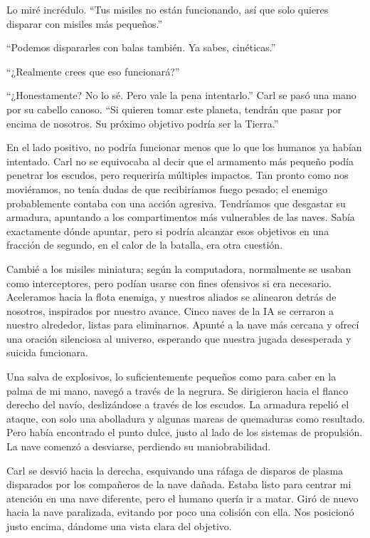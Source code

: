 Lo miré incrédulo. “Tus misiles no están funcionando, así que solo quieres disparar con misiles más pequeños.”

“Podemos dispararles con balas también. Ya sabes, cinéticas.”

“¿Realmente crees que eso funcionará?”

“¿Honestamente? No lo sé. Pero vale la pena intentarlo.” Carl se pasó una mano por su cabello canoso. “Si quieren tomar este planeta, tendrán que pasar por encima de nosotros. Su próximo objetivo podría ser la Tierra.”

En el lado positivo, no podría funcionar menos que lo que los humanos ya habían intentado. Carl no se equivocaba al decir que el armamento más pequeño podía penetrar los escudos, pero requeriría múltiples impactos. Tan pronto como nos moviéramos, no tenía dudas de que recibiríamos fuego pesado; el enemigo probablemente contaba con una acción agresiva. Tendríamos que desgastar su armadura, apuntando a los compartimentos más vulnerables de las naves. Sabía exactamente dónde apuntar, pero si podría alcanzar esos objetivos en una fracción de segundo, en el calor de la batalla, era otra cuestión.

Cambié a los misiles miniatura; según la computadora, normalmente se usaban como interceptores, pero podían usarse con fines ofensivos si era necesario. Aceleramos hacia la flota enemiga, y nuestros aliados se alinearon detrás de nosotros, inspirados por nuestro avance. Cinco naves de la IA se cerraron a nuestro alrededor, listas para eliminarnos. Apunté a la nave más cercana y ofrecí una oración silenciosa al universo, esperando que nuestra jugada desesperada y suicida funcionara.

Una salva de explosivos, lo suficientemente pequeños como para caber en la palma de mi mano, navegó a través de la negrura. Se dirigieron hacia el flanco derecho del navío, deslizándose a través de los escudos. La armadura repelió el ataque, con solo una abolladura y algunas marcas de quemaduras como resultado. Pero había encontrado el punto dulce, justo al lado de los sistemas de propulsión. La nave comenzó a desviarse, perdiendo su maniobrabilidad.

Carl se desvió hacia la derecha, esquivando una ráfaga de disparos de plasma disparados por los compañeros de la nave dañada. Estaba listo para centrar mi atención en una nave diferente, pero el humano quería ir a matar. Giró de nuevo hacia la nave paralizada, evitando por poco una colisión con ella. Nos posicionó justo encima, dándome una vista clara del objetivo.

